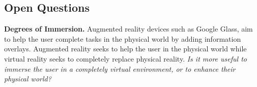\documentclass[conference]{IEEEtran}
\begin{document}



\subsection{Open Questions}

\textbf{Degrees of Immersion.} 
Augmented reality devices such as Google Glass, aim to help the user complete tasks in the physical world by adding information overlays. 
Augmented reality seeks to help the user in the physical world while virtual reality seeks to completely replace physical reality. 
\emph{Is it more useful to immerse the user in a completely virtual environment, or to enhance their physical world?}


\end{document}
